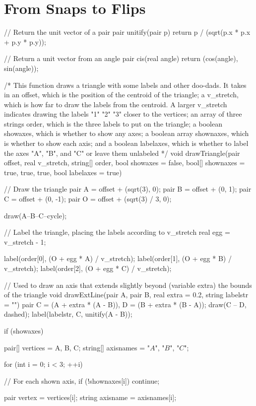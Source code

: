\documentclass[../textbook.tex]{subfiles}
\begin{document}
\section{From Snaps to Flips}

\newcommand{\degree}{\ensuremath{^\circ}}

\begin{asydef}
// Return the unit vector of a pair
pair unitify(pair p) {
return p / (sqrt(p.x * p.x + p.y * p.y));
}

// Return a unit vector from an angle
pair cis(real angle) {
return (cos(angle), sin(angle));
}

/*
This function draws a triangle with some labels and other doo-dads. It takes in an offset, which is the position of the centroid of the triangle;
a v_stretch, which is how far to draw the labels from the centroid. A larger v_stretch indicates drawing the labels "1" "2" "3" closer to the vertices;
an array of three strings order, which is the three labels to put on the triangle; a boolean showaxes, which is whether to show any axes; a boolean array
shownaxes, which is whether to show each axis; and a boolean labelaxes, which is whether to label the axes "A", "B", and "C" or leave them unlabeled
*/
void drawTriangle(pair offset, real v_stretch, string[] order, bool showaxes = false, bool[] shownaxes = {true, true, true}, bool labelaxes = true) {
// Draw the triangle
pair A = offset + (sqrt(3), 0);
pair B = offset + (0, 1);
pair C = offset + (0, -1);
pair O = offset + (sqrt(3) / 3, 0);

draw(A--B--C--cycle);

// Label the triangle, placing the labels according to v_stretch
real egg = v_stretch - 1;

label(order[0], (O + egg * A) / v_stretch);
label(order[1], (O + egg * B) / v_stretch);
label(order[2], (O + egg * C) / v_stretch);

// Used to draw an axis that extends slightly beyond (variable extra) the bounds of the triangle
void drawExtLine(pair A, pair B, real extra = 0.2, string labelstr = "") {
	pair C = (A + extra * (A - B)), D = (B + extra * (B - A));
	draw(C -- D, dashed);
	label(labelstr, C, unitify(A - B));
}

if (showaxes) {
pair[] vertices = {A, B, C};
string[] axisnames = {"$A$", "$B$", "$C$"};

for (int i = 0; i < 3; ++i) {
	// For each shown axis,
	if (!shownaxes[i]) continue;

	pair vertex = vertices[i];
	string axisname = axisnames[i];

}}}
\end{asydef}
\end{document}
